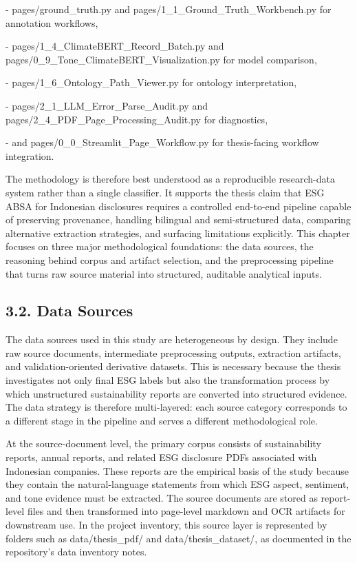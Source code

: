 \documentclass{article}
\begin{document}
- pages/ground\_truth.py and pages/1\_1\_Ground\_Truth\_Workbench.py for annotation workflows,

- pages/1\_4\_ClimateBERT\_Record\_Batch.py and pages/0\_9\_Tone\_ClimateBERT\_Visualization.py for model comparison,

- pages/1\_6\_Ontology\_Path\_Viewer.py for ontology interpretation,

- pages/2\_1\_LLM\_Error\_Parse\_Audit.py and pages/2\_4\_PDF\_Page\_Processing\_Audit.py for diagnostics,

- and pages/0\_0\_Streamlit\_Page\_Workflow.py for thesis-facing workflow integration.

The methodology is therefore best understood as a reproducible research-data system rather than a single classifier. It supports the thesis claim that ESG ABSA for Indonesian disclosures requires a controlled end-to-end pipeline capable of preserving provenance, handling bilingual and semi-structured data, comparing alternative extraction strategies, and surfacing limitations explicitly. This chapter focuses on three major methodological foundations: the data sources, the reasoning behind corpus and artifact selection, and the preprocessing pipeline that turns raw source material into structured, auditable analytical inputs.
\subsection*{3.2. Data Sources}

The data sources used in this study are heterogeneous by design. They include raw source documents, intermediate preprocessing outputs, extraction artifacts, and validation-oriented derivative datasets. This is necessary because the thesis investigates not only final ESG labels but also the transformation process by which unstructured sustainability reports are converted into structured evidence. The data strategy is therefore multi-layered: each source category corresponds to a different stage in the pipeline and serves a different methodological role.

At the source-document level, the primary corpus consists of sustainability reports, annual reports, and related ESG disclosure PDFs associated with Indonesian companies. These reports are the empirical basis of the study because they contain the natural-language statements from which ESG aspect, sentiment, and tone evidence must be extracted. The source documents are stored as report-level files and then transformed into page-level markdown and OCR artifacts for downstream use. In the project inventory, this source layer is represented by folders such as data/thesis\_pdf/ and data/thesis\_dataset/, as documented in the repository’s data inventory notes.
\end{document}

